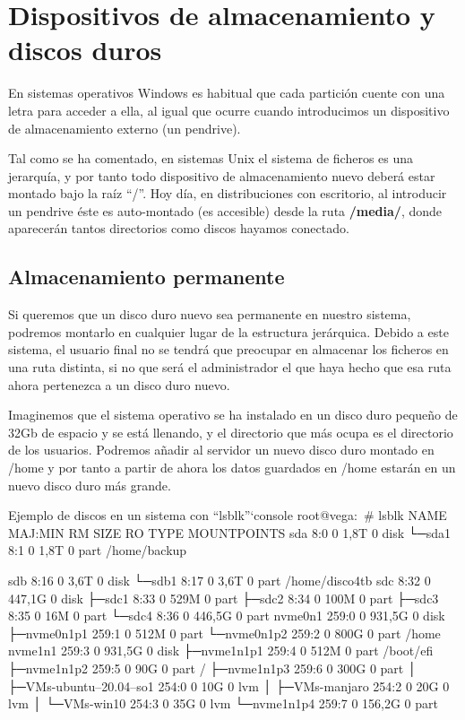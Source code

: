 \section{Dispositivos de almacenamiento y discos duros}
En sistemas operativos Windows es habitual que cada partición cuente con una letra para acceder a ella, al igual que ocurre cuando introducimos un dispositivo de almacenamiento externo (un pendrive).

Tal como se ha comentado, en sistemas Unix el sistema de ficheros es una jerarquía, y por tanto todo dispositivo de almacenamiento nuevo deberá estar montado bajo la raíz “/”. Hoy día, en distribuciones con escritorio, al introducir un pendrive éste es auto-montado (es accesible) desde la ruta \textbf{/media/}, donde aparecerán tantos directorios como discos hayamos conectado.

\subsection{Almacenamiento permanente}
Si queremos que un disco duro nuevo sea permanente en nuestro sistema, podremos montarlo en cualquier lugar de la estructura jerárquica. Debido a este sistema, el usuario final no se tendrá que preocupar en almacenar los ficheros en una ruta distinta, si no que será el administrador el que haya hecho que esa ruta ahora pertenezca a un disco duro nuevo.

Imaginemos que el sistema operativo se ha instalado en un disco duro pequeño de 32Gb de espacio y se está llenando, y el directorio que más ocupa es el directorio de los usuarios. Podremos añadir al servidor un nuevo disco duro montado en /home y por tanto a partir de ahora los datos guardados en /home estarán en un nuevo disco duro más grande.

\begin{mycode}{Ejemplo de discos en un sistema con ``lsblk''`}{console}{}
root@vega:~# lsblk
NAME                       MAJ:MIN RM   SIZE RO TYPE MOUNTPOINTS
sda                          8:0    0   1,8T  0 disk
└─sda1                       8:1    0   1,8T  0 part /home/backup

sdb                          8:16   0   3,6T  0 disk
└─sdb1                       8:17   0   3,6T  0 part /home/disco4tb
sdc                          8:32   0 447,1G  0 disk
├─sdc1                       8:33   0   529M  0 part
├─sdc2                       8:34   0   100M  0 part
├─sdc3                       8:35   0    16M  0 part
└─sdc4                       8:36   0 446,5G  0 part
nvme0n1                    259:0    0 931,5G  0 disk
├─nvme0n1p1                259:1    0   512M  0 part
└─nvme0n1p2                259:2    0   800G  0 part /home
nvme1n1                    259:3    0 931,5G  0 disk
├─nvme1n1p1                259:4    0   512M  0 part /boot/efi
├─nvme1n1p2                259:5    0    90G  0 part /
├─nvme1n1p3                259:6    0   300G  0 part
│ ├─VMs-ubuntu--20.04--so1 254:0    0    10G  0 lvm
│ ├─VMs-manjaro            254:2    0    20G  0 lvm
│ └─VMs-win10              254:3    0    35G  0 lvm
└─nvme1n1p4                259:7    0 156,2G  0 part
\end{mycode}


